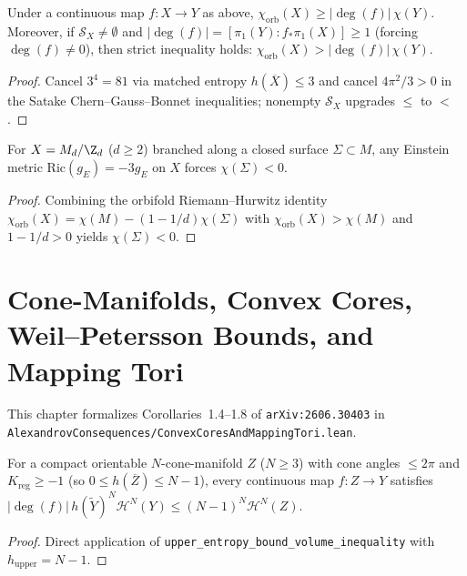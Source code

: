 \begin{corollary}
\label{cor_einstein_euler_obstruction}
\leanok
{}
Under a continuous map $f : X \to Y$ as above, $\chi_{\mathrm{orb}}(X) \ge |\deg(f)|\,\chi(Y)$.
Moreover, if $\mathcal{S}_X \neq \emptyset$ and $|\deg(f)| = [\pi_1(Y):f_*\pi_1(X)] \ge 1$
(forcing $\deg(f) \neq 0$), then strict inequality holds: $\chi_{\mathrm{orb}}(X) > |\deg(f)|\,\chi(Y)$.
\end{corollary}
\begin{proof}\leanok
Cancel $3^4 = 81$ via matched entropy $h(\overline{X}) \le 3$ and cancel $4\pi^2/3 > 0$ in the
Satake Chern--Gauss--Bonnet inequalities; nonempty $\mathcal{S}_X$ upgrades $\le$ to $<$.
\end{proof}

\begin{corollary}
\label{cor_gromov_thurston_euler_neg}
\leanok
{}
For $X = M_d / \Z_d$ ($d \ge 2$) branched along a closed surface $\Sigma \subset M$, any Einstein
metric $\mathrm{Ric}(g_E) = -3 g_E$ on $X$ forces $\chi(\Sigma) < 0$.
\end{corollary}
\begin{proof}\leanok
Combining the orbifold Riemann--Hurwitz identity $\chi_{\mathrm{orb}}(X) = \chi(M) - (1 - 1/d)\chi(\Sigma)$
with $\chi_{\mathrm{orb}}(X) > \chi(M)$ and $1 - 1/d > 0$ yields $\chi(\Sigma) < 0$.
\end{proof}

\chapter{Cone-Manifolds, Convex Cores, Weil--Petersson Bounds, and Mapping Tori}

This chapter formalizes Corollaries~1.4--1.8 of \texttt{arXiv:2606.30403} in
\texttt{AlexandrovConsequences/ConvexCoresAndMappingTori.lean}.

\begin{corollary}
\label{cor_cone_manifold}
\leanok
{}
For a compact orientable $N$-cone-manifold $Z$ ($N \ge 3$) with cone angles $\le 2\pi$ and
$K_{\mathrm{reg}} \ge -1$ (so $0 \le h(\overline{Z}) \le N - 1$), every continuous map $f : Z \to Y$
satisfies $|\deg(f)|\,h(\widetilde{Y})^N \mathcal{H}^N(Y) \le (N-1)^N \mathcal{H}^N(Z)$.
\end{corollary}
\begin{proof}\leanok
Direct application of \texttt{upper\_entropy\_bound\_volume\_inequality} with $h_{\mathrm{upper}} = N - 1$.
\end{proof}

